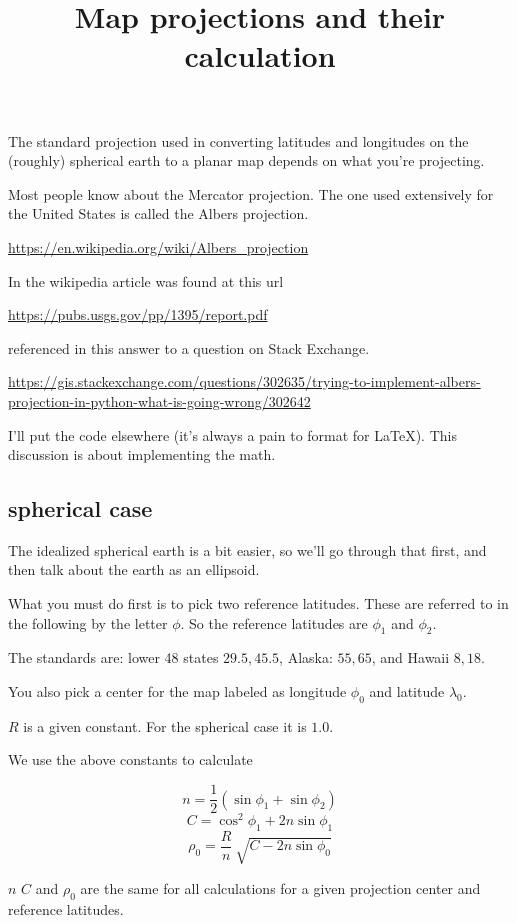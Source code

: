 \documentclass[11pt, oneside]{article}
\title{Map projections and their calculation}
\date{}
\begin{document}
\maketitle
\large

The standard projection used in converting latitudes and longitudes on the (roughly) spherical earth to a planar map depends on what you're projecting.

Most people know about the Mercator projection.  The one used extensively for the United States is called the Albers projection.

\url{https://en.wikipedia.org/wiki/Albers_projection}

In the wikipedia article was found at this url

\url{https://pubs.usgs.gov/pp/1395/report.pdf}

referenced in this answer to a question on Stack Exchange.

\url{https://gis.stackexchange.com/questions/302635/trying-to-implement-albers-projection-in-python-what-is-going-wrong/302642}

I'll put the code elsewhere (it's always a pain to format for LaTeX).  This discussion is about implementing the math.

\subsection*{spherical case}

The idealized spherical earth is a bit easier, so we'll go through that first, and then talk about the earth as an ellipsoid.

What you must do first is to pick two reference latitudes.  These are referred to in the following by the letter $\phi$.  So the reference latitudes are $\phi_1$ and $\phi_2$.

The standards are:  lower 48 states $29.5, 45.5$, Alaska: $55, 65$, and Hawaii $8,18$.

You also pick a center for the map labeled as longitude $\phi_0$ and latitude $\lambda_0$.

$R$ is a given constant.  For the spherical case it is $1.0$.

We use the above constants to calculate 

\[ n = \frac{1}{2}(\sin \phi_1 + \sin \phi_2) \]
\[ C = \cos^2 \phi_1 + 2n \sin \phi_1 \]
\[ \rho_0 =  \frac{R}{n} \ \sqrt{C - 2n \sin \phi_0} \]

$n$ $C$ and $\rho_0$ are the same for all calculations for a given projection center and reference latitudes.
\end{document}
